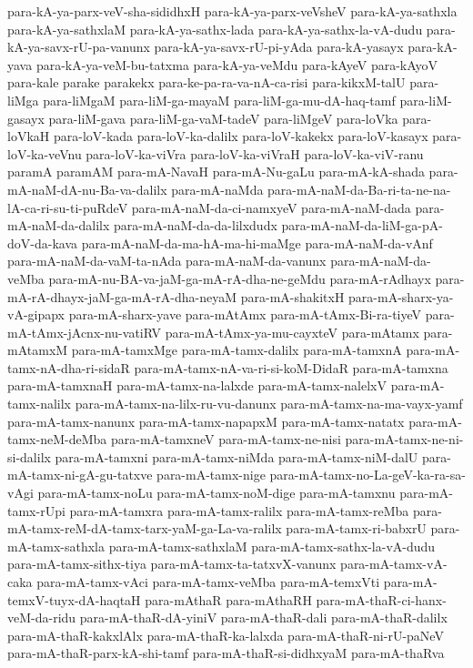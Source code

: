{para-kA-ya-parx-veV-sha-sididhxH
para-kA-ya-parx-veVsheV
para-kA-ya-sathxla
para-kA-ya-sathxlaM
para-kA-ya-sathx-lada
para-kA-ya-sathx-la-vA-dudu
para-kA-ya-savx-rU-pa-vanunx
para-kA-ya-savx-rU-pi-yAda
para-kA-yasayx
para-kA-yava
para-kA-ya-veM-bu-tatxma
para-kA-ya-veMdu
para-kAyeV
para-kAyoV
para-kale
parake
parakekx
para-ke-pa-ra-va-nA-ca-risi
para-kikxM-talU
para-liMga
para-liMgaM
para-liM-ga-mayaM
para-liM-ga-mu-dA-haq-tamf
para-liM-gasayx
para-liM-gava
para-liM-ga-vaM-tadeV
para-liMgeV
para-loVka
para-loVkaH
para-loV-kada
para-loV-ka-dalilx
para-loV-kakekx
para-loV-kasayx
para-loV-ka-veVnu
para-loV-ka-viVra
para-loV-ka-viVraH
para-loV-ka-viV-ranu
paramA
paramAM
para-mA-NavaH
para-mA-Nu-gaLu
para-mA-kA-shada
para-mA-naM-dA-nu-Ba-va-dalilx
para-mA-naMda
para-mA-naM-da-Ba-ri-ta-ne-na-lA-ca-ri-su-ti-puRdeV
para-mA-naM-da-ci-namxyeV
para-mA-naM-dada
para-mA-naM-da-dalilx
para-mA-naM-da-da-lilxdudx
para-mA-naM-da-liM-ga-pA-doV-da-kava
para-mA-naM-da-ma-hA-ma-hi-maMge
para-mA-naM-da-vAnf
para-mA-naM-da-vaM-ta-nAda
para-mA-naM-da-vanunx
para-mA-naM-da-veMba
para-mA-nu-BA-va-jaM-ga-mA-rA-dha-ne-geMdu
para-mA-rAdhayx
para-mA-rA-dhayx-jaM-ga-mA-rA-dha-neyaM
para-mA-shakitxH
para-mA-sharx-ya-vA-gipapx
para-mA-sharx-yave
para-mAtAmx
para-mA-tAmx-Bi-ra-tiyeV
para-mA-tAmx-jAcnx-nu-vatiRV
para-mA-tAmx-ya-mu-cayxteV
para-mAtamx
para-mAtamxM
para-mA-tamxMge
para-mA-tamx-dalilx
para-mA-tamxnA
para-mA-tamx-nA-dha-ri-sidaR
para-mA-tamx-nA-va-ri-si-koM-DidaR
para-mA-tamxna
para-mA-tamxnaH
para-mA-tamx-na-lalxde
para-mA-tamx-nalelxV
para-mA-tamx-nalilx
para-mA-tamx-na-lilx-ru-vu-danunx
para-mA-tamx-na-ma-vayx-yamf
para-mA-tamx-nanunx
para-mA-tamx-napapxM
para-mA-tamx-natatx
para-mA-tamx-neM-deMba
para-mA-tamxneV
para-mA-tamx-ne-nisi
para-mA-tamx-ne-ni-si-dalilx
para-mA-tamxni
para-mA-tamx-niMda
para-mA-tamx-niM-dalU
para-mA-tamx-ni-gA-gu-tatxve
para-mA-tamx-nige
para-mA-tamx-no-La-geV-ka-ra-sa-vAgi
para-mA-tamx-noLu
para-mA-tamx-noM-dige
para-mA-tamxnu
para-mA-tamx-rUpi
para-mA-tamxra
para-mA-tamx-ralilx
para-mA-tamx-reMba
para-mA-tamx-reM-dA-tamx-tarx-yaM-ga-La-va-ralilx
para-mA-tamx-ri-babxrU
para-mA-tamx-sathxla
para-mA-tamx-sathxlaM
para-mA-tamx-sathx-la-vA-dudu
para-mA-tamx-sithx-tiya
para-mA-tamx-ta-tatxvX-vanunx
para-mA-tamx-vA-caka
para-mA-tamx-vAci
para-mA-tamx-veMba
para-mA-temxVti
para-mA-temxV-tuyx-dA-haqtaH
para-mAthaR
para-mAthaRH
para-mA-thaR-ci-hanx-veM-da-ridu
para-mA-thaR-dA-yiniV
para-mA-thaR-dali
para-mA-thaR-dalilx
para-mA-thaR-kakxlAlx
para-mA-thaR-ka-lalxda
para-mA-thaR-ni-rU-paNeV
para-mA-thaR-parx-kA-shi-tamf
para-mA-thaR-si-didhxyaM
para-mA-thaRva
}
